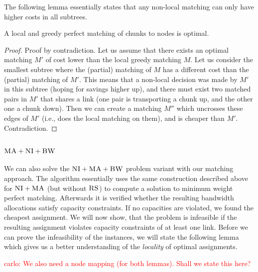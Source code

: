 \documentclass[9pt,twocolumn]{scrartcl}
\newcommand{\carlo}[1]{\textcolor{red}{carlo: #1}}
\newcommand{\CC}{\textsc{NI}}
\newcommand{\RS}{\textsc{RS}}
\newcommand{\BW}{\textsc{BW}}
\newcommand{\MA}{\textsc{MA}}
\begin{document}
The following lemma essentially states that any non-local matching can only have higher
costs in all subtrees. 
\begin{lemma}\label{lemma:local}
A local and greedy perfect matching of chunks to nodes is optimal.
\end{lemma}
\begin{proof}
Proof by contradiction. Let us assume that there exists an optimal matching $M'$ of cost lower
than the local greedy matching $M$. 
Let us consider the smallest subtree where the (partial) matching of $M$ 
has a different cost than the (partial) matching of $M'$. 
This means 
that a non-local decision was made by $M'$ in this subtree (hoping for savings higher up),
and there must exist two matched pairs in $M'$ that shares a link (one pair is transporting a chunk up, and
 the other one a chunk down). Then we can create a matching $M''$ 
 which uncrosses these edges of $M'$ (i.e., does the local matching on them),
  and is cheaper than $M'$. Contradiction.
\end{proof}


\subsubsection{$\MA+\CC+\BW$}

We can also solve the $\CC+\MA+\BW$ problem variant with our matching approach. The algorithm 
essentially uses
the same construction described above for $\CC+\MA$ (but without $\RS$) to compute a solution
to minimum weight perfect matching. Afterwards it is verified whether the
resulting bandwidth allocations satisfy capacity constraints. If
no capacities are violated, we found the cheapest assignment. We will
now show, that the problem is infeasible if the resulting assignment
violates capacity constraints of at least one link. 
Before we can prove the infeasibility of the instances, we will 
state the following lemma
which gives us a better understanding of the \emph{locality} of optimal assignments.

\carlo{We also need a node mapping (for both lemmas). Shall we state this here?}
\end{document}

